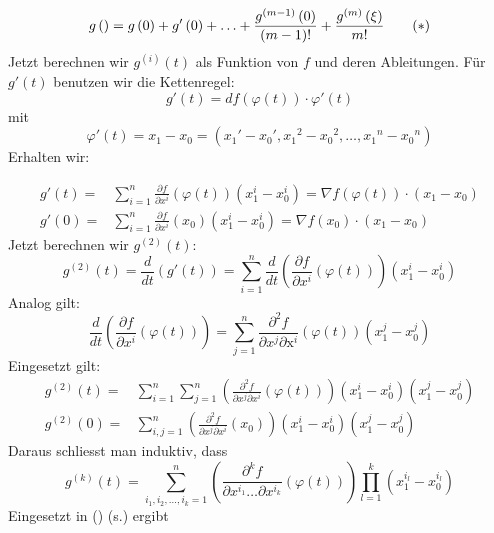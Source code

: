 \[
g\left( {} \right) = g\left( 0 \right) + g'\left( 0 \right) +  \ldots  + \frac{{{g^{\left( {m - 1} \right)}}\left( 0 \right)}}{{\left( {m - 1} \right)!}} + \frac{{{g^{\left( m \right)}}\left( \xi  \right)}}{{m!}}\tag{\textasteriskcentered\label{Chap8Equation,Taylor}}
\]
Jetzt berechnen wir $g^{(i)}(t)$ als Funktion von $f$ und deren Ableitungen. Für $g'(t)$ benutzen wir die Kettenregel:
\[g'(t)=df\left( \varphi (t)\right) \cdot\varphi' (t)\] mit \[\varphi '(t) = {x_1} - {x_0} = \left( {{x_1}' - {x_0}',{x_1}^2 - {x_0}^2, \ldots ,{x_1}^n - {x_0}^n} \right)\] Erhalten wir:

\begin{align*}
g'(t) = & \sum\limits_{i = 1}^n {\frac{{\partial f}}{{\partial {x^i}}}\left( {\varphi (t)} \right)\left( {x_1^i - x_0^i} \right)}  = \nabla f\left( {\varphi (t)} \right) \cdot \left( {{x_1} - {x_0}} \right)\\
g'(0) = & \sum\limits_{i = 1}^n {\frac{{\partial f}}{{\partial {x^i}}}\left( {x_0} \right)\left( {x_1^i - x_0^i} \right)}  = \nabla f\left( {x_0} \right) \cdot \left( {{x_1} - {x_0}} \right)
\end{align*}
Jetzt berechnen wir $g^{(2)}(t)$:\[{g^{(2)}}(t) = \frac{d}{{dt}}\left( {g'\left( t \right)} \right) = \sum\limits_{i = 1}^n {\frac{d}{{dt}}\left( {\frac{{\partial f}}{{\partial {x^i}}}\left( {\varphi \left( t \right)} \right)} \right)} \left( {x_1^i - x_0^i} \right)\]
Analog gilt:
\[\frac{d}{{dt}}\left( {\frac{{\partial f}}{{\partial {x^i}}}\left( {\varphi \left( t \right)} \right)} \right) = \sum\limits_{j = 1}^n {\frac{{{\partial ^2}f}}{{\partial {x^j}\partial {{\text{x}}^i}}}\left( {\varphi \left( t \right)} \right)\left( {x_1^j - x_0^j} \right)} \]
Eingesetzt gilt:
\begin{align*}
{g^{(2)}}(t) = & \sum\limits_{i = 1}^n {\sum\limits_{j = 1}^n {\left( {\frac{{{\partial ^2}f}}{{\partial {x^j}\partial {x^i}}}\left( {\varphi (t)} \right)} \right)} } \left( {x_1^i - x_0^i} \right)\left( {x_1^j - x_0^j} \right)\\
{g^{(2)}}(0) = & \sum\limits_{i,j = 1}^n {\left( {\frac{{{\partial ^2}f}}{{\partial {x^j}\partial {x^i}}}\left( {{x_0}} \right)} \right)} \left( {x_1^i - x_0^i} \right)\left( {x_1^j - x_0^j} \right)
\end{align*}
Daraus schliesst man induktiv, dass
\[{g^{(k)}}(t) = \sum\limits_{{i_1},{i_2}, \ldots ,{i_k} = 1}^n {\left( {\frac{{{\partial ^k}f}}{{\partial {x^{{i_1}}} \ldots \partial {x^{{i_k}}}}}\left( {\varphi (t)} \right)} \right)} \prod\limits_{l = 1}^k {\left( {x_1^{{i_l}} - x_0^{{i_l}}} \right)} \]
Eingesetzt in (\textasteriskcentered) (s.\pageref{Chap8Equation,Taylor}) ergibt 

